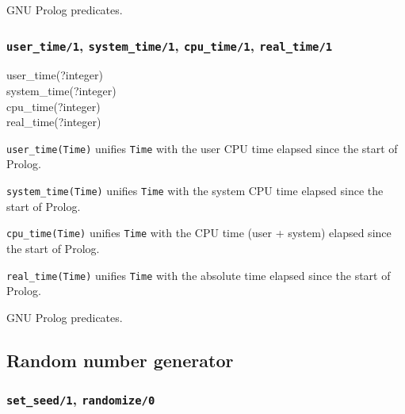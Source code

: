 \Portability

GNU Prolog predicates.

\subsubsection{\texttt{user\_time/1},
               \texttt{system\_time/1},
               \texttt{cpu\_time/1},
               \texttt{real\_time/1}}
\label{user-time/1}

\begin{TemplatesOneCol}
user\_time(?integer)\\
system\_time(?integer)\\
cpu\_time(?integer)\\
real\_time(?integer)

\end{TemplatesOneCol}

\Description

\texttt{user\_time(Time)} unifies \texttt{Time} with the user
CPU time elapsed since the start of Prolog.

\texttt{system\_time(Time)} unifies \texttt{Time} with the
system CPU time elapsed since the start of Prolog.

\texttt{cpu\_time(Time)} unifies \texttt{Time} with the CPU
time (user + system) elapsed since the start of Prolog.

\texttt{real\_time(Time)} unifies \texttt{Time} with the
absolute time elapsed since the start of Prolog.

\begin{PlErrors}


\end{PlErrors}

\Portability

GNU Prolog predicates.

\subsection{Random number generator}

\subsubsection{\texttt{set\_seed/1},
               \texttt{randomize/0}}

